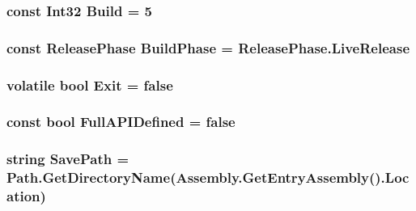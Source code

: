 \subsubsection[{Build}]{\setlength{\rightskip}{0pt plus 5cm}const Int32 Build = 5}\label{classOTA_1_1Globals_a0e2d534f5f115f0ee44d41e9aa18f07b}
\hypertarget{classOTA_1_1Globals_a80cc35ea126fb86a6681c8ad2c98b801}{}
\subsubsection[{Build\+Phase}]{\setlength{\rightskip}{0pt plus 5cm}const {\bf Release\+Phase} Build\+Phase = {\bf Release\+Phase.\+Live\+Release}}\label{classOTA_1_1Globals_a80cc35ea126fb86a6681c8ad2c98b801}
\hypertarget{classOTA_1_1Globals_a1ca6f335e9c1353a51ecf18d1694f860}{}
\subsubsection[{Exit}]{\setlength{\rightskip}{0pt plus 5cm}volatile bool Exit = false\hspace{0.3cm}{\ttfamily [static]}}\label{classOTA_1_1Globals_a1ca6f335e9c1353a51ecf18d1694f860}
\hypertarget{classOTA_1_1Globals_a98d5afccbdbb7c0ead2dda04b4e77b93}{}
\subsubsection[{Full\+A\+P\+I\+Defined}]{\setlength{\rightskip}{0pt plus 5cm}const bool Full\+A\+P\+I\+Defined = false}\label{classOTA_1_1Globals_a98d5afccbdbb7c0ead2dda04b4e77b93}
\hypertarget{classOTA_1_1Globals_afa83db25fd4b8853aafbb2625786d4a8}{}
\subsubsection[{Save\+Path}]{\setlength{\rightskip}{0pt plus 5cm}string Save\+Path = Path.\+Get\+Directory\+Name(Assembly.\+Get\+Entry\+Assembly().Location)\hspace{0.3cm}{\ttfamily [static]}}\label{classOTA_1_1Globals_afa83db25fd4b8853aafbb2625786d4a8}


